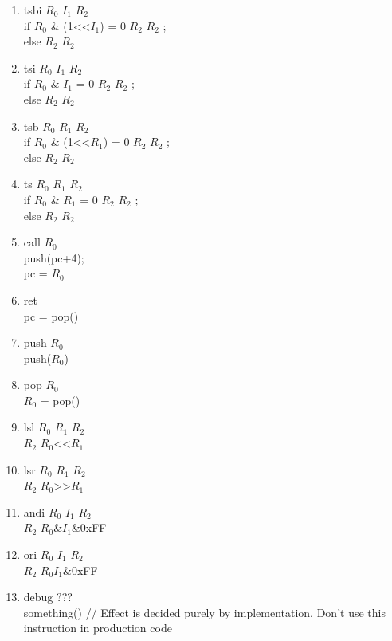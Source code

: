 \documentclass{article}
\begin{document}
\begin{enumerate}
			if $R_0$ = 0 $R_2$ \textleftarrow $R_1$
		\item tsbi $R_0$ $I_1$ $R_2$\\
			if $R_0$ \& (1\textless\textless$I_1$) = 0 $R_2$ \textleftarrow \space $R_2$ \textbar {};\\
			else $R_2$ \textleftarrow \space $R_2$ \textbar {}
		\item tsi $R_0$ $I_1$ $R_2$\\
			if $R_0$ \& $I_1$ = 0 $R_2$ \textleftarrow \space $R_2$ \textbar {};\\
			else $R_2$ \textleftarrow \space $R_2$ \textbar {}
		\item tsb $R_0$ $R_1$ $R_2$\\
			if $R_0$ \& (1\textless\textless$R_1$) = 0 $R_2$ \textleftarrow \space $R_2$ \textbar {};\\
			else $R_2$ \textleftarrow \space $R_2$ \textbar {}
		\item ts $R_0$ $R_1$ $R_2$\\
			if $R_0$ \& $R_1$ = 0 $R_2$ \textleftarrow \space $R_2$ \textbar {};\\
			else $R_2$ \textleftarrow \space $R_2$ \textbar {}
		\item call $R_0$\\
			push(pc+4);\\
			pc = $R_0$
		\item ret\\
			pc = pop()
		\item push $R_0$\\
			push($R_0$)
		\item pop $R_0$\\
			$R_0$ = pop()
		\item lsl $R_0$ $R_1$ $R_2$\\
			$R_2$ \textleftarrow \space $R_0$\textless\textless$R_1$
		\item lsr $R_0$ $R_1$ $R_2$\\
			$R_2$ \textleftarrow \space $R_0$\textgreater\textgreater$R_1$
		\item andi $R_0$ $I_1$ $R_2$\\
			$R_2$ \textleftarrow \space $R_0$\&$I_1$\&0xFF
		\item ori $R_0$ $I_1$ $R_2$\\
			$R_2$ \textleftarrow \space $R_0$\textbar$I_1$\&0xFF
		\item debug ???\\
			something()
			// Effect is decided purely by implementation. Don't use this instruction in production code

\end{enumerate}
\end{document}
